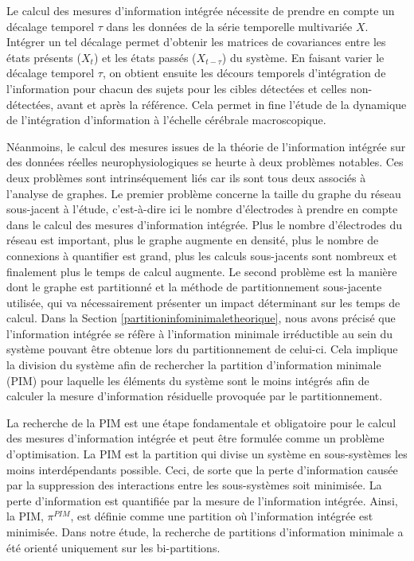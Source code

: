 Le calcul des mesures d'information intégrée nécessite de prendre en compte un décalage temporel $\tau$ dans les données de la série temporelle multivariée $X$. 
Intégrer un tel décalage permet d'obtenir les matrices de covariances entre les états présents ($X_t$) et les états passés ($X_{t-\tau}$) du système. 
En faisant varier le décalage temporel $\tau$, on obtient ensuite les décours temporels d’intégration de l’information pour chacun des sujets pour les cibles détectées et celles non-détectées, avant et après la référence. 
Cela permet in fine l'étude de la dynamique de l'intégration d'information à l'échelle cérébrale macroscopique. 

Néanmoins, le calcul des mesures issues de la théorie de l'information intégrée sur des données réelles neurophysiologiques se heurte à deux problèmes notables. 
Ces deux problèmes sont intrinséquement liés car ils sont tous deux associés à l'analyse de graphes. 
Le premier problème concerne la taille du graphe du réseau sous-jacent à l'étude, c'est-à-dire ici le nombre d'électrodes à prendre en compte dans le calcul des mesures d'information intégrée. 
Plus le nombre d'électrodes du réseau est important, plus le graphe augmente en densité, plus le nombre de connexions à quantifier est grand, plus les calculs sous-jacents sont nombreux et finalement plus le temps de calcul augmente. 
Le second problème est la manière dont le graphe est partitionné et la méthode de partitionnement sous-jacente utilisée, qui va nécessairement présenter un impact déterminant sur les temps de calcul. 
Dans la Section \ref{partitioninfominimaletheorique}, nous avons précisé que l’information intégrée se réfère à l'information minimale irréductible au sein du système pouvant être obtenue lors du partitionnement de celui-ci. 
Cela implique la division du système afin de rechercher la partition d'information minimale (PIM) pour laquelle les éléments du système sont le moins intégrés afin de calculer la mesure d’information résiduelle provoquée par le partitionnement. 

La recherche de la PIM est une étape fondamentale et obligatoire pour le calcul des mesures d'information intégrée et peut être formulée comme un problème d'optimisation. 
La PIM est la partition qui divise un système en sous-systèmes les moins interdépendants possible. 
Ceci, de sorte que la perte d'information causée par la suppression des interactions entre les sous-systèmes soit minimisée. 
La perte d'information est quantifiée par la mesure de l'information intégrée. 
Ainsi, la PIM, $\pi^{PIM}$, est définie comme une partition où l'information intégrée est minimisée. 
Dans notre étude, la recherche de partitions d'information minimale a été orienté uniquement sur les bi-partitions. 

